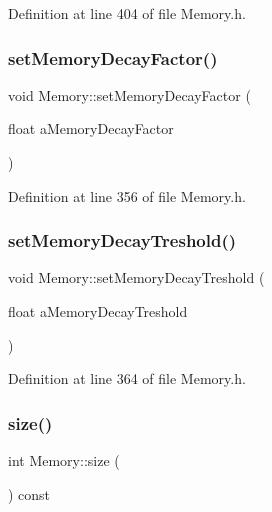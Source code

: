 Definition at line 404 of file Memory.\+h.

\mbox{\label{class_memory_ab9449f7b75eeb52bf50a9e4ae08da8f0}} 
\subsubsection{\texorpdfstring{set\+Memory\+Decay\+Factor()}{setMemoryDecayFactor()}}
{\footnotesize\ttfamily void Memory\+::set\+Memory\+Decay\+Factor (\begin{DoxyParamCaption}\item[{float}]{a\+Memory\+Decay\+Factor }\end{DoxyParamCaption})\hspace{0.3cm}{\ttfamily [inline]}}



Definition at line 356 of file Memory.\+h.

\mbox{\label{class_memory_a035e450994077e442b5607e72b22cb0c}} 
\subsubsection{\texorpdfstring{set\+Memory\+Decay\+Treshold()}{setMemoryDecayTreshold()}}
{\footnotesize\ttfamily void Memory\+::set\+Memory\+Decay\+Treshold (\begin{DoxyParamCaption}\item[{float}]{a\+Memory\+Decay\+Treshold }\end{DoxyParamCaption})\hspace{0.3cm}{\ttfamily [inline]}}



Definition at line 364 of file Memory.\+h.

\mbox{\label{class_memory_a91ac81338123d3b57a7f5ee62db8ec8d}} 
\subsubsection{\texorpdfstring{size()}{size()}}
{\footnotesize\ttfamily int Memory\+::size (\begin{DoxyParamCaption}{ }\end{DoxyParamCaption}) const\hspace{0.3cm}{\ttfamily [inline]}}



